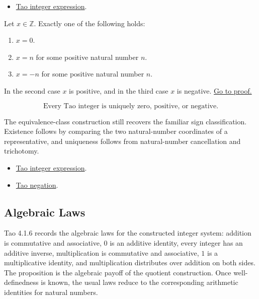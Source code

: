 \begin{dependencies}
\begin{itemize}
  \item \hyperref[def:tao-integer-expression]{Tao integer expression}.
\end{itemize}
\end{dependencies}

\begin{lemma}
\label{lem:int-trichotomy}
Let \(x\in\mathbb{Z}\). Exactly one of the following holds:
\begin{enumerate}
  \item \(x=0\).
  \item \(x=n\) for some positive natural number \(n\).
  \item \(x=-n\) for some positive natural number \(n\).
\end{enumerate}
In the second case \(x\) is positive, and in the third case \(x\) is negative.
\hyperref[prf:int-trichotomy]{Go to proof.}
\end{lemma}

\begin{remark*}
\[
  \text{Every Tao integer is uniquely zero, positive, or negative.}
\]
\end{remark*}

\begin{remark*}[Interpretation]
The equivalence-class construction still recovers the familiar sign
classification. Existence follows by comparing the two natural-number
coordinates of a representative, and uniqueness follows from natural-number
cancellation and trichotomy.
\end{remark*}

\begin{dependencies}
\begin{itemize}
  \item \hyperref[def:tao-integer-expression]{Tao integer expression}.
  \item \hyperref[def:tao-negation]{Tao negation}.
\end{itemize}
\end{dependencies}

\subsection*{Algebraic Laws}

\begin{remark*}[Exposition]
Tao 4.1.6 records the algebraic laws for the constructed integer system:
addition is commutative and associative, \(0\) is an additive identity, every
integer has an additive inverse, multiplication is commutative and associative,
\(1\) is a multiplicative identity, and multiplication distributes over
addition on both sides.
The proposition is the algebraic payoff of the quotient construction. Once
well-definedness is known, the usual laws reduce to the corresponding
arithmetic identities for natural numbers.
\end{remark*}

